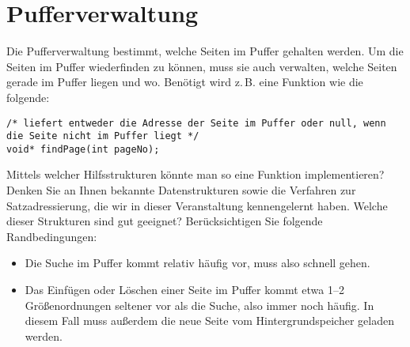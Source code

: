 \section{Pufferverwaltung}
Die Pufferverwaltung bestimmt, welche Seiten im Puffer gehalten werden. Um die Seiten im Puffer wiederfinden zu können, muss sie auch verwalten, welche Seiten gerade im Puffer liegen und wo. Benötigt wird z.\,B. eine Funktion wie die folgende:

\texttt{/* liefert entweder die Adresse der Seite im Puffer \beamertxt{\linebreak}
oder null, wenn die \normaltxt{\linebreak}
Seite nicht im Puffer liegt */\\
	void* findPage(int pageNo); }

Mittels welcher Hilfsstrukturen könnte man so eine Funktion implementieren? Denken Sie an Ihnen bekannte Datenstrukturen sowie die Verfahren zur Satzadressierung, die wir in dieser Veranstaltung kennengelernt haben. Welche dieser Strukturen sind gut geeignet? Berücksichtigen Sie folgende Randbedingungen:
\begin{itemize}
	\item Die Suche im Puffer kommt relativ häufig vor, muss also schnell gehen.
	\item Das Einfügen oder Löschen einer Seite im Puffer kommt etwa 1--2 Größenordnungen seltener vor als die Suche, also immer noch häufig. In diesem Fall muss außerdem die neue Seite vom Hintergrundspeicher geladen werden.
\end{itemize}

